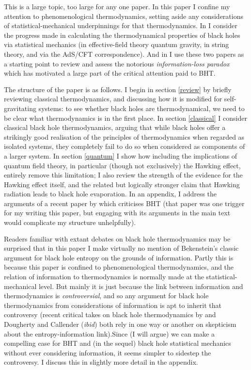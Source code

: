 \documentclass[12pt]{article}
\begin{document}
This is a large topic, too large for any one paper. In this paper I confine my attention to phenomenological thermodynamics, setting aside any considerations of statistical-mechanical underpinnings for that thermodynamics. In  I consider the progress made in calculating the thermodynamical properties of black holes via statistical mechanics (in effective-field theory quantum gravity, in string theory, and via the AdS/CFT correspondence). And in  I use these two papers as a starting point to review and assess the notorious \emph{information-loss paradox} which has motivated a large part of the critical attention paid to BHT.

The structure of the paper is as follows. I begin in section \ref{review} by briefly reviewing classical thermodynamics, and discussing how it is modified for self-gravitating systems: to see whether black holes are thermodynamical, we need to be clear what thermodynamics is in the first place. In section \ref{classical} I consider classical black hole thermodynamics, arguing that while black holes offer a strikingly good realisation of the principles of thermodynamics when regarded as isolated systems, they completely fail to do so when considered as components of a larger system. In section \ref{quantum} I show how including the implications of quantum field theory, in particular (though not exclusively) the Hawking effect, entirely remove this limitation; I also review the strength of the evidence for the Hawking effect itself, and the related but logically stronger claim that Hawking radiation leads to black hole evaporation. In an appendix, I address the arguments of a recent paper by  which criticises BHT (that paper was one trigger for my writing this paper, but engaging with its arguments in the main text would complicate my structure unhelpfully).

Readers familiar with extant debates on black hole thermodynamics may be surprised that in this paper I make virtually no mention of Bekenstein's classic argument \cite{Bekenstein1973} for black hole entropy on the grounds of information. Partly this is because this paper is confined to phenomenological thermodynamics, and the relation of information to thermodynamics is normally made at the statistical-mechanical level. But mainly it is just because the link between information and thermodynamics is \emph{controversial}, and so any argument for black hole thermodynamics from considerations of information is apt to inherit that controversy (recent critical takes on black hole thermodynamics by  and Dougherty and Callender (\emph{ibid}) both rely in one way or another on skepticism about the entropy-information link).Since (I will argue) we can make a compelling case for BHT and (in the sequel) black hole statistical mechanics without ever considering information, it seems simpler to sidestep the controversy. I discuss this in slightly more detail in the appendix.
\end{document}
